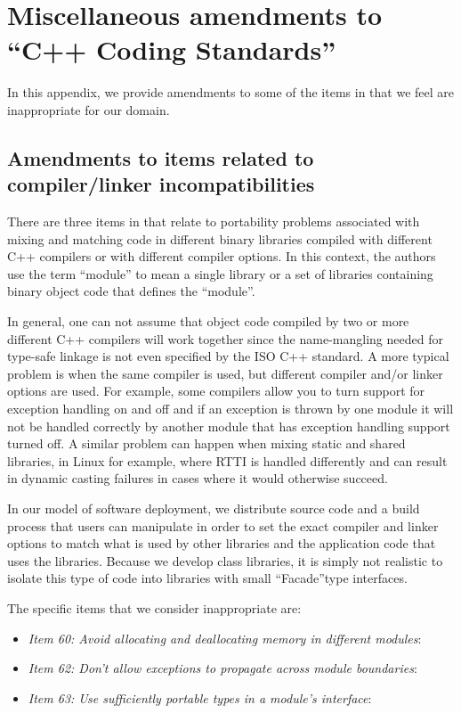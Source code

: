 %
\section{Miscellaneous amendments to ``C++ Coding Standards''}
\label{sec:misc_amendments}
%

In this appendix, we provide amendments to some of the items in
{}\cite{C++CodingStandards05} that we feel are inappropriate for our domain.

%
\subsection{Amendments to items related to compiler/linker incompatibilities}
%

There are three items in {}\cite{C++CodingStandards05} that relate to
portability problems associated with mixing and matching code in different
binary libraries compiled with different C++ compilers or with different
compiler options.  In this context, the authors use the term ``module'' to
mean a single library or a set of libraries containing binary object code that
defines the ``module''.

In general, one can not assume that object code compiled by two or more
different C++ compilers will work together since the name-mangling needed for
type-safe linkage is not even specified by the ISO C++ standard.  A more
typical problem is when the same compiler is used, but different compiler
and/or linker options are used.  For example, some compilers allow you to turn
support for exception handling on and off and if an exception is thrown by one
module it will not be handled correctly by another module that has exception
handling support turned off.  A similar problem can happen when mixing static
and shared libraries, in Linux for example, where RTTI is handled differently
and can result in dynamic casting failures in cases where it would otherwise
succeed.

In our model of software deployment, we distribute source code and a build
process that users can manipulate in order to set the exact compiler and
linker options to match what is used by other libraries and the application
code that uses the libraries.  Because we develop class libraries, it is
simply not realistic to isolate this type of code into libraries with small
``Facade''type interfaces.

The specific items that we consider inappropriate are:

\begin{itemize}

{}\item\textit{Item 60: Avoid allocating and deallocating memory in different
modules}:

{}\item\textit{Item 62: Don't allow exceptions to propagate across module
boundaries}:

{}\item\textit{Item 63: Use sufficiently portable types in a module's
interface}:

\end{itemize}

